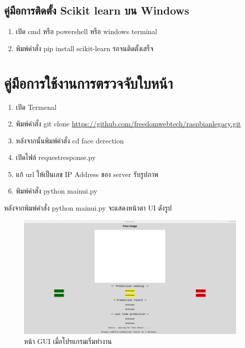 \subsection{คู่มือการติดตั้ง Scikit learn บน Windows}
\begin{enumerate}
  \item เปิด cmd หรือ powershell หรือ windows terminal
  \item พิมพ์คำสั่ง pip install scikit-learn รอจนติดตั้งเสร็จ
\end{enumerate}


\section{คู่มือการใช้งานการตรวจจับใบหน้า}
\begin{enumerate}
  \item เปิด Termenal
  \item พิมพ์คำสั่ง git clone \url{https://github.com/freedomwebtech/raspbianlegacy.git}
  \item หลังจากนั้นพิมพ์คำสั่ง cd face derection
  \item เปิดไฟล์ request\textunderscore response.py 
  \item แก้ url ให้เป็นเลข IP Address ของ server รับรูปภาพ
  \item พิมพ์คำสั่ง python main\textunderscore ui.py
\end{enumerate}

หลังจากพิมพ์คำสั่ง python main\textunderscore ui.py จะแสดงหน้าตา UI ดังรูป

\begin{figure}[!ht]
  \begin{center}
    \includegraphics[scale=.3]{pic/main_page.png}
    \caption{หน้า GUI เมื่อโปรแกรมเริ่มทำงาน}
  \end{center}
\end{figure}

